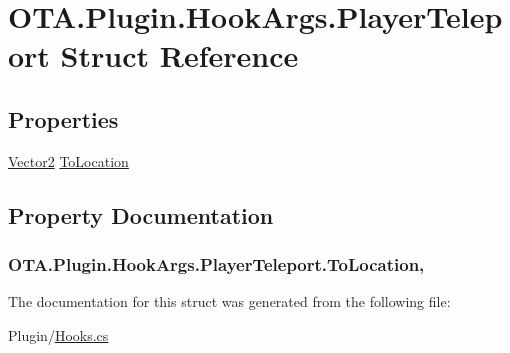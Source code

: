 \hypertarget{struct_o_t_a_1_1_plugin_1_1_hook_args_1_1_player_teleport}{}\section{O\+T\+A.\+Plugin.\+Hook\+Args.\+Player\+Teleport Struct Reference}
\label{struct_o_t_a_1_1_plugin_1_1_hook_args_1_1_player_teleport}
\subsection*{Properties}
\begin{DoxyCompactItemize}
\item 
\hyperlink{struct_microsoft_1_1_xna_1_1_framework_1_1_vector2}{Vector2} \hyperlink{struct_o_t_a_1_1_plugin_1_1_hook_args_1_1_player_teleport_ac8c0e923b9c2c97cc605be3e521a9533}{To\+Location}
\end{DoxyCompactItemize}


\subsection{Property Documentation}
\hypertarget{struct_o_t_a_1_1_plugin_1_1_hook_args_1_1_player_teleport_ac8c0e923b9c2c97cc605be3e521a9533}{}
\subsubsection[{To\+Location}]{ O\+T\+A.\+Plugin.\+Hook\+Args.\+Player\+Teleport.\+To\+Location\hspace{0.3cm}{\ttfamily [get]}, {\ttfamily [set]}}\label{struct_o_t_a_1_1_plugin_1_1_hook_args_1_1_player_teleport_ac8c0e923b9c2c97cc605be3e521a9533}


The documentation for this struct was generated from the following file\+:\begin{DoxyCompactItemize}
\item 
Plugin/\hyperlink{_hooks_8cs}{Hooks.\+cs}\end{DoxyCompactItemize}
